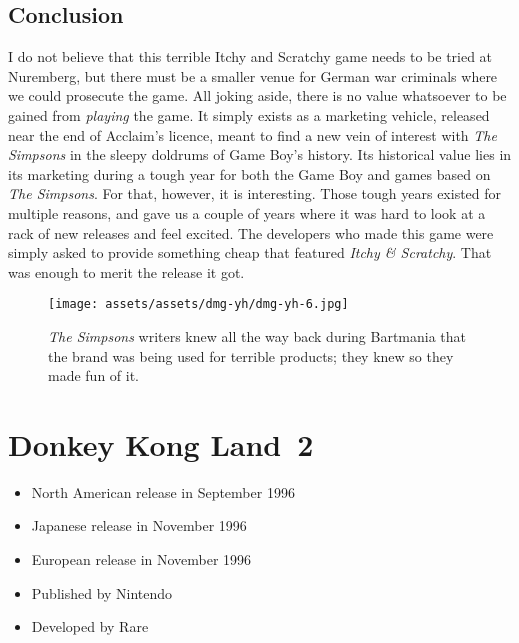 \documentclass{book}
\begin{document}
\FloatBarrier\needspace{10mm}\section*{Conclusion}\nopagebreak[4]

I do not believe that this terrible Itchy and Scratchy game needs to be tried at Nuremberg, but there must be a smaller venue for German war criminals where we could prosecute the game. All joking aside, there is no value whatsoever to be gained from \emph{playing} the game. It simply exists as a marketing vehicle, released near the end of Acclaim’s licence, meant to find a new vein of interest with \emph{The Simpsons} in the sleepy doldrums of Game Boy’s history. Its historical value lies in its marketing during a tough year for both the Game Boy and games based on \emph{The Simpsons}. For that, however, it is interesting. Those tough years existed for multiple reasons, and gave us a couple of years where it was hard to look at a rack of new releases and feel excited. The developers who made this game were simply asked to provide something cheap that featured \emph{Itchy \& Scratchy}. That was enough to merit the release it got.

\begin{figure}[hbt]
\vskip 10pt
\centering \texttt{[image: assets/assets/dmg-yh/dmg-yh-6.jpg]}\par\pagetwodescription \emph{The Simpsons} writers knew all the way back during Bartmania that the brand was being used for terrible products; they knew so they made fun of it.
\vskip 6pt
\end{figure}


\begingroup \chapter*{Donkey Kong Land 2} \endgroup

\begin{itemize} \setlength\itemsep{-0.4em}
\item North American release in September 1996
\item Japanese release in November 1996
\item European release in November 1996
\item Published by Nintendo
\item Developed by Rare
\end{itemize}\noindent
\end{document}
